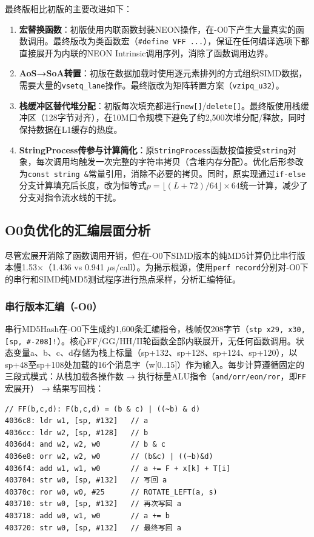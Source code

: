 \documentclass[UTF8,a4paper,10pt]{ctexart}
\begin{document}
最终版相比初版的主要改进如下：

\begin{enumerate}
  \item \textbf{宏替换函数}：初版使用内联函数封装NEON操作，在-O0下产生大量真实的函数调用。最终版改为类函数宏（\lstinline{#define VFF ...}），保证在任何编译选项下都直接展开为内联的NEON Intrinsic调用序列，消除了函数调用边界。
  \item \textbf{AoS→SoA转置}：初版在数据加载时使用逐元素排列的方式组织SIMD数据，需要大量的\lstinline{vsetq_lane}操作。最终版改为矩阵转置方案（\lstinline{vzipq_u32}）。
  \item \textbf{栈缓冲区替代堆分配}：初版每次填充都进行\lstinline{new[]}/\lstinline{delete[]}。最终版使用栈缓冲区（128字节对齐），在10M口令规模下避免了约2,500次堆分配/释放，同时保持数据在L1缓存的热度。
  \item \textbf{StringProcess传参与计算简化}：原\lstinline{StringProcess}函数按值接受\lstinline{string}对象，每次调用均触发一次完整的字符串拷贝（含堆内存分配）。优化后形参改为\lstinline{const string &}常量引用，消除不必要的拷贝。同时，原实现通过\lstinline{if-else}分支计算填充后长度，改为恒等式$p = \lfloor (L+72)/64 \rfloor \times 64$统一计算，减少了分支对指令流水线的干扰。
\end{enumerate}

\subsection{O0负优化的汇编层面分析}
\label{sec:o0-asm}

尽管宏展开消除了函数调用开销，但在-O0下SIMD版本的纯MD5计算仍比串行版本慢1.53$\times$（1.436 vs 0.941 $\mu$s/call）。为揭示根源，使用\lstinline{perf record}分别对-O0下的串行和SIMD纯MD5测试程序进行热点采样，分析汇编特征。

\subsubsection{串行版本汇编（-O0）}

串行MD5Hash在-O0下生成约1,600条汇编指令，栈帧仅208字节（\lstinline{stp x29, x30, [sp, #-208]!}）。核心FF/GG/HH/II轮函数全部内联展开，无任何函数调用。状态变量a、b、c、d存储为栈上标量（sp+132、sp+128、sp+124、sp+120），以sp+48至sp+108处加载的16个消息字（w[0..15]）作为输入。每步计算遵循固定的三段式模式：从栈加载各操作数 → 执行标量ALU指令（\lstinline{and/orr/eon/ror}，即\lstinline{FF}宏展开） → 结果写回栈：

\begin{lstlisting}[language={},basicstyle=\ttfamily\small,columns=flexible,aboveskip=4pt,belowskip=4pt]
// FF(b,c,d): F(b,c,d) = (b & c) | ((~b) & d)
4036c8: ldr w1, [sp, #132]   // a
4036cc: ldr w2, [sp, #128]   // b
4036d4: and w2, w2, w0       // b & c
4036e8: orr w2, w2, w0       // (b&c) | ((~b)&d)
4036f4: add w1, w1, w0       // a += F + x[k] + T[i]
403704: str w0, [sp, #132]   // 写回 a
40370c: ror w0, w0, #25      // ROTATE_LEFT(a, s)
403710: str w0, [sp, #132]   // 再次写回 a
403718: add w0, w1, w0       // a += b
403720: str w0, [sp, #132]   // 最终写回 a
\end{lstlisting}
\end{document}
